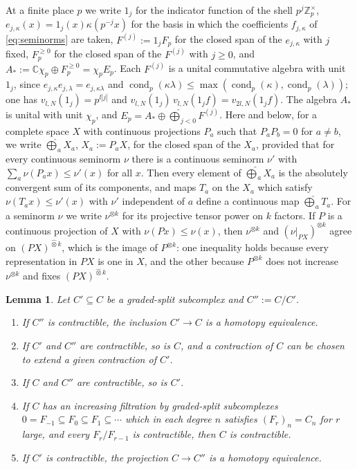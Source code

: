 \documentclass[11pt]{amsart}
\newtheorem{lemma}[theorem]{Lemma}
\theoremstyle{definition}
\theoremstyle{remark}
\newcommand{\C}{\mathbb C}
\newcommand{\Z}{\mathbb Z}
\newcommand{\cond}{\operatorname{cond}}
\begin{document}
At a finite place $p$ we write $1_j$ for the indicator function of the shell
$p^{j}\Z_p^{\times}$, $e_{j,\kappa}(x)=1_j(x)\kappa(p^{-j}x)$ for the basis in
which the coefficients $f_{j,\kappa}$ of \eqref{eq:seminorms} are taken,
$F^{(j)}:=1_jF_p$ for the closed span of the $e_{j,\kappa}$ with $j$ fixed,
$F_p^{\ge0}$ for the closed span of the $F^{(j)}$ with $j\ge0$, and
$A_*:=\C\chi_p\oplus F_p^{\ge0}=\chi_pE_p$.  Each $F^{(j)}$ is a unital
commutative algebra with unit $1_j$, since $e_{j,\kappa}e_{j,\lambda}=e_{j,\kappa\lambda}$
and $\cond_p(\kappa\lambda)\le\max(\cond_p(\kappa),\cond_p(\lambda))$; one has
$v_{l,N}(1_j)=p^{l|j|}$ and $v_{l,N}(1_j)\,v_{l,N}(1_jf)=v_{2l,N}(1_jf)$.
The algebra $A_*$ is unital with unit $\chi_p$, and
$E_p=A_*\oplus\widehat\bigoplus_{j<0}F^{(j)}$.  Here and below, for a
complete space $X$ with continuous projections $P_a$ such that $P_aP_b=0$ for
$a\ne b$, we write $\widehat\bigoplus_aX_a$, $X_a:=P_aX$, for the closed
span of the $X_a$, provided that for every continuous seminorm $\nu$ there is
a continuous seminorm $\nu'$ with $\sum_a\nu(P_ax)\le\nu'(x)$ for all $x$.
Then every element of $\widehat\bigoplus_aX_a$ is the absolutely convergent
sum of its components, and maps $T_a$ on the $X_a$ which satisfy
$\nu(T_ax)\le\nu'(x)$ with $\nu'$ independent of $a$ define a continuous
map $\widehat\bigoplus_aT_a$.  For a seminorm $\nu$ we write $\nu^{\otimes k}$
for its projective tensor power on $k$ factors.  If $P$ is a continuous
projection of $X$ with $\nu(Px)\le\nu(x)$, then $\nu^{\otimes k}$ and
$(\nu|_{PX})^{\otimes k}$ agree on $(PX)^{\widehat\otimes k}$, which is the
image of $P^{\otimes k}$: one inequality holds because every representation
in $PX$ is one in $X$, and the other because $P^{\otimes k}$ does not increase
$\nu^{\otimes k}$ and fixes $(PX)^{\widehat\otimes k}$.

\begin{lemma}\label{lem:split}
Let $C'\subseteq C$ be a graded-split subcomplex and $C'':=C/C'$.
\begin{enumerate}
\item[(a)] If $C''$ is contractible, the inclusion $C'\to C$ is a homotopy
equivalence.
\item[(b)] If $C'$ and $C''$ are contractible, so is $C$, and a contraction of
$C$ can be chosen to extend a given contraction of $C'$.
\item[(c)] If $C$ and $C''$ are contractible, so is $C'$.
\item[(d)] If $C$ has an increasing filtration by graded-split subcomplexes
$0=F_{-1}\subseteq F_0\subseteq F_1\subseteq\cdots$ which in each degree $n$
satisfies $(F_r)_n=C_n$ for $r$ large, and every $F_r/F_{r-1}$ is contractible,
then $C$ is contractible.
\item[(e)] If $C'$ is contractible, the projection $C\to C''$ is a homotopy
equivalence.
\end{enumerate}
\end{lemma}
\end{document}
